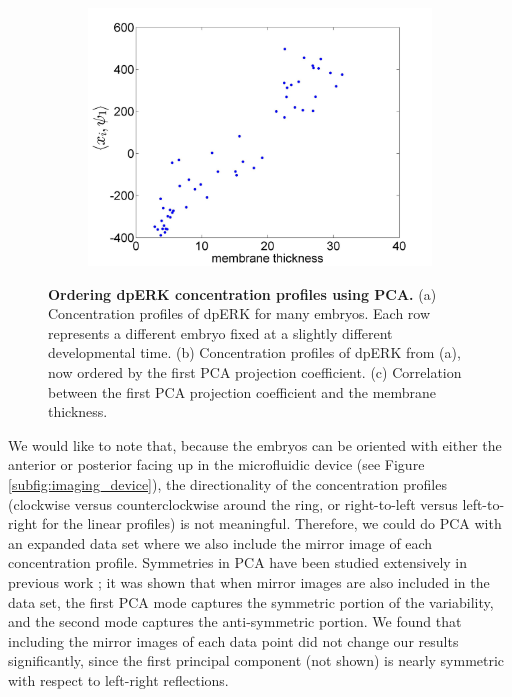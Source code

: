 \documentclass[10pt]{article}
\begin{document}
\begin{figure}[!ht]
\begin{subfigure}{0.3\textwidth}
\includegraphics[width=\textwidth]{PCA_time_corr}
\caption{}
\end{subfigure}
\caption{{\bf Ordering dpERK concentration profiles using PCA.} (a) Concentration profiles of dpERK for many embryos. Each row represents a different embryo fixed at a slightly different developmental time.
(b) Concentration profiles of dpERK from (a), now ordered by the first PCA projection coefficient.
(c) Correlation between the first PCA projection coefficient and the membrane thickness.}
\label{fig:PCA_ordering}
\end{figure}

We would like to note that, because the embryos can be oriented with either the anterior or posterior facing up in the microfluidic device (see Figure \ref{subfig:imaging_device}), the directionality of the concentration profiles (clockwise versus counterclockwise around the ring, or right-to-left versus left-to-right for the linear profiles) is not meaningful. 
%
Therefore, we could do PCA with an expanded data set where we also include the mirror image of each concentration profile.
%
Symmetries in PCA have been studied extensively in previous work \cite{holmes1998turbulence}; it was shown that when mirror images are also included in the data set, the first PCA mode captures the symmetric portion of the variability, and the second mode captures the anti-symmetric portion.
%
We found that including the mirror images of each data point did not change our results significantly, since the first principal component (not shown) is nearly symmetric with respect to left-right reflections.
\end{document}
